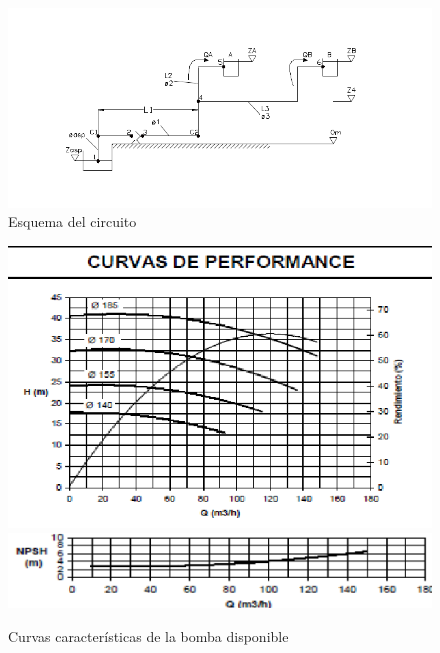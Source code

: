 \documentclass[a4paper,10pt]{article}
\begin{document}
\begin{enumerate}
\begin{figure}[hb]
\centering
\includegraphics[width=1.1\textwidth]{circuitoGeneral.png}
\caption{Esquema del circuito}
\label{fig:circuito}
\end{figure}


\begin{figure}[hb]
\centering
\includegraphics[width=\textwidth]{bomba.png}
\includegraphics[width=\textwidth]{ANPA.png}
\caption{Curvas características de la bomba disponible}
\label{fig:bomba}
\end{figure}

\end{enumerate}
\end{document}
